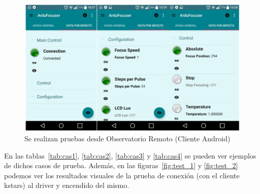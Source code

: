  \begin{figure}[h]
	\centering
	\includegraphics[width=1\linewidth]{../images/obs_remoto_driver_full}
	\caption[Pruebas desde Observatorio Remoto]{Se realizan pruebas desde Observatorio Remoto (Cliente Android)}
	\label{fig:remote_obs}
\end{figure}

En las tablas~\ref{tab:cas1}, \ref{tab:cas2}, \ref{tab:cas3} y \ref{tab:cas4} se pueden ver ejemplos de dichos casos de prueba. Además, en las figuras~\ref{fig:test_1} y \ref{fig:test_2} podemos ver los resultados visuales de la prueba de conexión (con el cliente kstars) al driver y encendido del mismo.

